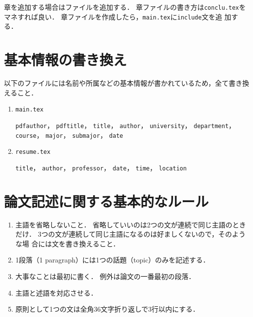 章を追加する場合はファイルを追加する．
章ファイルの書き方は\texttt{conclu.tex}をマネすれば良い．
章ファイルを作成したら，\texttt{main.tex}に\texttt{\yen include}文を追
加する．

\section{基本情報の書き換え}

以下のファイルには名前や所属などの基本情報が書かれているため，全て書き換
えること．

\begin{enumerate}
 \item \texttt{main.tex}

       \texttt{pdfauthor}，
       \texttt{pdftitle}，
       \texttt{\yen title}，
       \texttt{\yen author}，
       \texttt{\yen university}，
       \texttt{\yen department}，
       \texttt{\yen course}，
       \texttt{\yen major}，
       \texttt{\yen submajor}，
       \texttt{\yen date}
 \item \texttt{resume.tex}

       \texttt{\yen title}，
       \texttt{\yen author}，
       \texttt{\yen professor}，
       \texttt{\yen date}，
       \texttt{\yen time}，
       \texttt{\yen location}
\end{enumerate}

\section{論文記述に関する基本的なルール}

\begin{enumerate}
 \item 主語を省略しないこと．
       省略していいのは2つの文が連続で同じ主語のときだけ．
       3つの文が連続して同じ主語になるのは好ましくないので，そのような場
       合には文を書き換えること．
 \item 1段落（1 paragraph）には1つの話題（topic）のみを記述する．
 \item 大事なことは最初に書く．
       例外は論文の一番最初の段落．
 \item 主語と述語を対応させる．
 \item 原則として1つの文は全角36文字折り返しで3行以内にする．
\end{enumerate}

